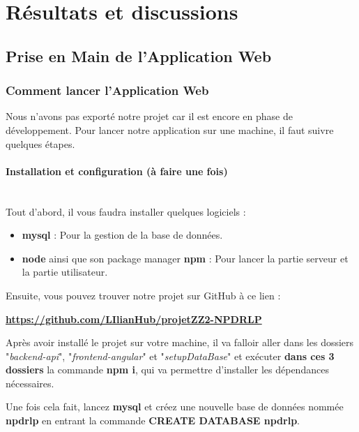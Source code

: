 \documentclass[12pt,french]{article}
\begin{document}
\section{Résultats et discussions}

\subsection{Prise en Main de l'Application Web}

\subsubsection{Comment lancer l'Application Web}

Nous n'avons pas exporté notre projet car il est encore en phase de développement. Pour lancer notre application sur une machine, il faut suivre quelques étapes.

\paragraph{Installation et configuration (à faire une fois) \\\\}

Tout d'abord, il vous faudra installer quelques logiciels :

\begin{itemize}
	\item \textbf{mysql} : Pour la gestion de la base de données.
	\item \textbf{node} ainsi que son package manager \textbf{npm} : Pour lancer la partie serveur et la partie utilisateur.
\end{itemize}

\bigskip

Ensuite, vous pouvez trouver notre projet sur GitHub à ce lien :

\textbf{\href{https://github.com/LIlianHub/projetZZ2-NPDRLP}{https://github.com/LIlianHub/projetZZ2-NPDRLP}}

\bigskip

Après avoir installé le projet sur votre machine, il va falloir aller dans les dossiers "\textit{backend-api}", "\textit{frontend-angular}" et "\textit{setupDataBase}" et exécuter \textbf{dans ces 3 dossiers} la commande \textbf{npm i}, qui va permettre d'installer les dépendances nécessaires.

\bigskip

Une fois cela fait, lancez \textbf{mysql} et créez une nouvelle base de données nommée \textbf{npdrlp} en entrant la commande \textbf{CREATE DATABASE npdrlp}.
\end{document}
